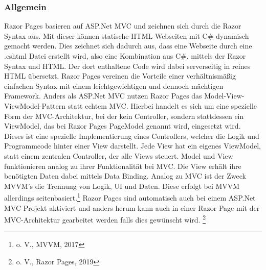 \documentclass[a4paper,
12pt,
oneside]
{article}
\begin{document}
	\subsubsection{Allgemein}
	Razor Pages basieren auf ASP.Net MVC und zeichnen sich durch die Razor Syntax aus. Mit dieser können statische HTML Webseiten mit C\# dynamisch gemacht werden. Dies zeichnet sich dadurch aus, dass eine Webseite durch eine .cshtml Datei erstellt wird, also eine Kombination aus C\#, mittels der Razor Syntax und HTML. Der dort enthaltene Code wird dabei serverseitig in reines HTML übersetzt. Razor Pages vereinen die Vorteile einer verhältnismäßig einfachen Syntax mit einem leichtgewichtigen und dennoch mächtigen Framework. Anders als ASP.Net MVC nutzen Razor Pages das Model-View-ViewModel-Pattern statt echtem MVC. Hierbei handelt es sich um eine spezielle Form der MVC-Architektur, bei der kein Controller, sondern stattdessen ein ViewModel, das bei Razor Pages PageModel genannt wird, eingesetzt wird. Dieses ist eine spezielle Implementierung eines Controllers, welcher die Logik und Programmcode hinter einer View darstellt. Jede View hat ein eigenes ViewModel, statt einem zentralen Controller, der alle Views steuert. Model und View funktionieren analog zu ihrer Funktionalität bei MVC. Die View erhält ihre benötigten Daten dabei mittels Data Binding. Analog zu MVC ist der Zweck MVVM's die Trennung von Logik, UI und Daten. Diese erfolgt bei MVVM allerdings seitenbasiert.\footnote{o. V., MVVM, 2017} Razor Pages sind automatisch auch bei einem ASP.Net MVC Projekt aktiviert und anders herum kann auch in einer Razor Page mit der MVC-Architektur gearbeitet werden falls dies gewünscht wird. \footnote{o. V., Razor Pages, 2019}
	
\end{document}

